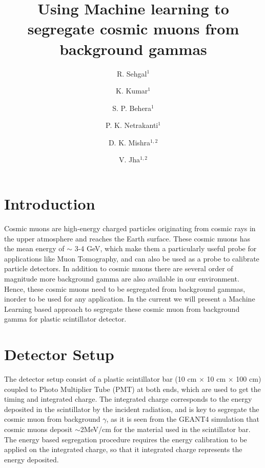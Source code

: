 \documentclass[twocolumn,amsmath,amssymb]{snp}
\begin{document}
\title{{\Large Using Machine learning to segregate cosmic muons from background gammas}}%

\author{\large R. Sehgal$^1$}
\author{\large K. Kumar$^1$}
\author{\large S. P. Behera$^1$}
\author{\large P. K. Netrakanti$^1$}
\author{\large D. K. Mishra$^{1,2}$}
\author{\large V. Jha$^{1,2}$}

\maketitle


\section*{Introduction}
Cosmic muons are high-energy charged particles originating from cosmic rays in the upper atmosphere and reaches the Earth surface. These cosmic muons has the mean energy of $\sim$ 3-4 GeV, which make them a particularly useful probe for applications like Muon Tomography, and can also be used as a probe to calibrate particle detectors. In addition to cosmic muons there are several order of magnitude more background gamma are also available in our environment. Hence, these cosmic muons need to be segregated from background gammas, inorder to be used for any application. In the current we will present a Machine Learning based approach to segregate these cosmic muon from background gamma for plastic scintillator detector.

\section*{Detector Setup}
The detector setup consist of a plastic scintillator bar (10 cm $\times$ 10 cm $\times$ 100 cm) coupled to Photo Multiplier Tube (PMT) at both ends, which are used to get the timing and integrated charge. The integrated charge corresponds to the energy deposited in the scintillator by the incident radiation, and is key to segregate the cosmic muon from background $\gamma$, as it is seen from the GEANT4 \cite{geant} simulation that cosmic muons deposit $\sim$2MeV/cm for the material used in the scintillator bar. The energy based segregation procedure requires the energy calibration to be applied on the integrated charge, so that it integrated charge represents the energy deposited.
\end{document}
